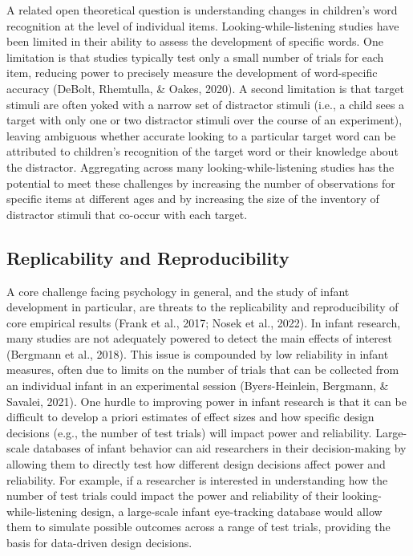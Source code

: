 \documentclass[
  english,
  man,floatsintext]{apa6}
\begin{document}
A related open theoretical question is understanding changes in children's word recognition at the level of individual items.
Looking-while-listening studies have been limited in their ability to assess the development of specific words.
One limitation is that studies typically test only a small number of trials for each item, reducing power to precisely measure the development of word-specific accuracy (DeBolt, Rhemtulla, \& Oakes, 2020).
A second limitation is that target stimuli are often yoked with a narrow set of distractor stimuli (i.e., a child sees a target with only one or two distractor stimuli over the course of an experiment), leaving ambiguous whether accurate looking to a particular target word can be attributed to children's recognition of the target word or their knowledge about the distractor.
Aggregating across many looking-while-listening studies has the potential to meet these challenges by increasing the number of observations for specific items at different ages and by increasing the size of the inventory of distractor stimuli that co-occur with each target.

\hypertarget{replicability-and-reproducibility}{%
\subsection{Replicability and Reproducibility}\label{replicability-and-reproducibility}}

A core challenge facing psychology in general, and the study of infant development in particular, are threats to the replicability and reproducibility of core empirical results (Frank et al., 2017; Nosek et al., 2022).
In infant research, many studies are not adequately powered to detect the main effects of interest (Bergmann et al., 2018).
This issue is compounded by low reliability in infant measures, often due to limits on the number of trials that can be collected from an individual infant in an experimental session (Byers-Heinlein, Bergmann, \& Savalei, 2021).
One hurdle to improving power in infant research is that it can be difficult to develop a priori estimates of effect sizes and how specific design decisions (e.g., the number of test trials) will impact power and reliability.
Large-scale databases of infant behavior can aid researchers in their decision-making by allowing them to directly test how different design decisions affect power and reliability.
For example, if a researcher is interested in understanding how the number of test trials could impact the power and reliability of their looking-while-listening design, a large-scale infant eye-tracking database would allow them to simulate possible outcomes across a range of test trials, providing the basis for data-driven design decisions.
\end{document}
